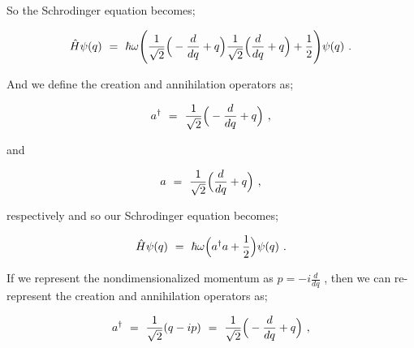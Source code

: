 \documentclass{article}
\begin{document}
So the Schrodinger equation becomes;

\begin{equation} \label{eq:256}
\hat{H}\psi(q) \hspace{0.125cm} = \hspace{0.125cm} \hbar \omega \Bigg( \frac{1}{\sqrt{2}} \Big( -\frac{d}{dq} + q \Big) \frac{1}{\sqrt{2}} \Big( \frac{d}{dq} + q \Big) + \frac{1}{2} \Bigg) \psi(q) \hspace{0.125cm} .
\end{equation}

And we define the creation and annihilation operators as;

\begin{equation} \label{eq:256}
a^{\dagger} \hspace{0.125cm} = \hspace{0.125cm} \frac{1}{\sqrt{2}} \Big( -\frac{d}{dq} + q \Big) \hspace{0.125cm} ,
\end{equation}

and

\begin{equation} \label{eq:256}
a \hspace{0.125cm} = \hspace{0.125cm} \frac{1}{\sqrt{2}} \Big( \frac{d}{dq} + q \Big)  \hspace{0.125cm} ,
\end{equation}

 respectively and so our Schrodinger equation becomes;

\begin{equation} \label{eq:256}
\hat{H}\psi(q) \hspace{0.125cm} = \hspace{0.125cm} \hbar \omega \Big( a^{\dagger} a + \frac{1}{2} \Big) \psi(q) \hspace{0.125cm} .
\end{equation}

If we represent the nondimensionalized momentum as \begin{math} p = -i\frac{d}{dq} \end{math} , then we can re-represent the creation and annihilation operators as;

\begin{equation} \label{eq:256}
a^{\dagger} \hspace{0.125cm} = \hspace{0.125cm}  \frac{1}{\sqrt{2}} ( q - i p) \hspace{0.125cm} = \hspace{0.125cm} \frac{1}{\sqrt{2}} \Big( -\frac{d}{dq} + q \Big) \hspace{0.125cm} ,
\end{equation}
\end{document}
